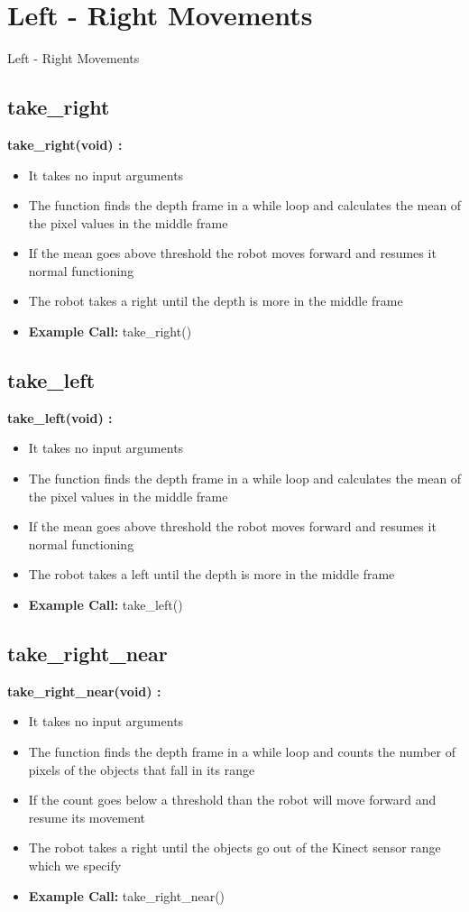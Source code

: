 \documentclass[10pt, a4paper]{beamer}
\begin{document}
\section{Left - Right Movements}
\begin{frame}[allowframebreaks]{Left - Right Movements}
  \subsection{take\_right}
    \textbf{take\_right(void) : }
      \begin{itemize}
	\item It takes no input arguments
	\item The function finds the depth frame in a while loop and calculates the mean of the pixel values in the middle frame
	\item If the mean goes above threshold the robot moves forward and resumes it normal functioning
	\item The robot takes a right until the depth is more in the middle frame
	\item \textbf{Example Call:} take\_right()
      \end{itemize}
\framebreak
  \subsection{take\_left}
    \textbf{take\_left(void) : }
      \begin{itemize}
	\item It takes no input arguments
	\item The function finds the depth frame in a while loop and calculates the mean of the pixel values in the middle frame
	\item If the mean goes above threshold the robot moves forward and resumes it normal functioning
	\item The robot takes a left until the depth is more in the middle frame
	\item \textbf{Example Call:} take\_left()
      \end{itemize}
\framebreak
  \subsection{take\_right\_near}
    \textbf{take\_right\_near(void) : }
      \begin{itemize}
       \item It takes no input arguments
       \item The function finds the depth frame in a while loop and counts the number of pixels of the objects that fall in its range
       \item If the count goes below a threshold than the robot will move forward and resume its movement
       \item The robot takes a right until the objects go out of the Kinect sensor range which we specify
       \item \textbf{Example Call:} take\_right\_near()
      \end{itemize}
\framebreak

\end{frame}
\end{document}
